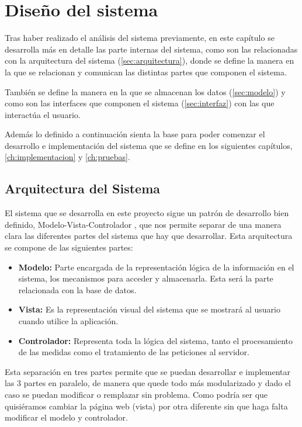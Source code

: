 \chapter{Diseño del sistema}
\label{ch:diseno}
Tras haber realizado el análisis del sistema previamente, en este capítulo se desarrolla más en detalle las parte internas del sistema, como son las relacionadas con la arquitectura del sistema (\autoref{sec:arquitectura}), donde se define la manera en la que se relacionan y comunican las distintas partes que componen el sistema. 

También se define la manera en la que se almacenan los datos (\autoref{sec:modelo}) y como son las interfaces que componen el sistema (\autoref{sec:interfaz}) con las que interactúa el usuario. 

Además lo definido a continuación sienta la base para poder comenzar el desarrollo e implementación del sistema que se define en los siguientes capítulos, \autoref{ch:implementacion} y \autoref{ch:pruebas}.

\section{Arquitectura del Sistema}\label{sec:arquitectura}
El sistema que se desarrolla en este proyecto sigue un patrón de desarrollo bien definido, Modelo-Vista-Controlador \cite{bucanek_model-view-controller_2009}, que nos permite separar de una manera clara las diferentes partes del sistema que hay que desarrollar. Esta arquitectura se compone de las siguientes partes:
\begin{itemize}
    \item \textbf{Modelo:} Parte encargada de la representación lógica de la información en el sistema, los mecanismos para acceder y almacenarla. Esta será la parte relacionada con la base de datos.
    \item \textbf{Vista:} Es la representación visual del sistema que se mostrará al usuario cuando utilice la aplicación.
    \item \textbf{Controlador:} Representa toda la lógica del sistema, tanto el procesamiento de las medidas como el tratamiento de las peticiones al servidor.
\end{itemize}

Esta separación en tres partes permite que se puedan desarrollar e implementar las 3 partes en paralelo, de manera que quede todo más modularizado y dado el caso se puedan modificar o remplazar sin problema. Como podría ser que quisiéramos cambiar la página web (vista) por otra diferente sin que haga falta modificar el modelo y controlador. 

